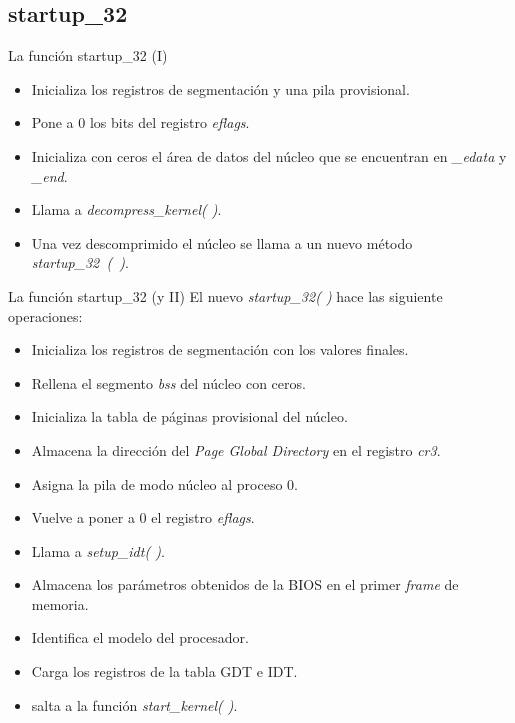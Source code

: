 \subsection{startup\_32}
\begin{frame}{La función startup\_32 (I)}
	\begin{itemize}
		\item Inicializa los registros de segmentación y una pila provisional.
		\item Pone a 0 los bits del registro \emph{eflags}.
		\item Inicializa con ceros el área de datos del núcleo que se encuentran en \emph{\_edata} y \emph{\_end}.
		\item Llama a \emph{decompress\_kernel( )}.
		\item Una vez descomprimido el núcleo se llama a un nuevo método \emph{startup\_32~(~)}.
	\end{itemize}
\end{frame}
\begin{frame}{La función startup\_32 (y II)}
	El nuevo \emph{startup\_32( )} hace las siguiente operaciones:
	\begin{itemize}
		\item Inicializa los registros de segmentación con los valores finales.
		\item Rellena el segmento \emph{bss} del núcleo con ceros.
		\item Inicializa la tabla de páginas provisional del núcleo.
		\item Almacena la dirección del \emph{Page Global Directory} en el registro \emph{cr3}.
		\item Asigna la pila de modo núcleo al proceso 0.
		\item Vuelve a poner a 0 el registro \emph{eflags}.
		\item Llama a \emph{setup\_idt( )}.
		\item Almacena los parámetros obtenidos de la BIOS en el primer \emph{frame} de memoria.
		\item Identifica el modelo del procesador.
		\item Carga los registros de la tabla GDT e IDT.
		\item salta a la función \emph{start\_kernel( )}. 
	\end{itemize}
\end{frame}

